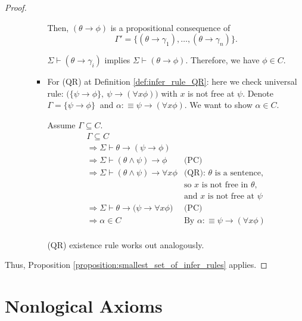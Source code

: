 \documentclass[11pt,letterpaper]{book}
\theoremstyle{definition}
\begin{document}
\begin{proof}
\begin{enumerate}
\begin{enumerate}
\begin{itemize}
{Then, $(\theta \rightarrow \phi)$ is a propositional consequence of
$$\Gamma' = \{ (\theta \rightarrow \gamma_1), \ldots, (\theta
\rightarrow \gamma_n)  \} .$$

$\Sigma \vdash (\theta \rightarrow \gamma_i)$ implies $\Sigma \vdash
(\theta \rightarrow \phi) $. Therefore, we have $\phi \in C$.
}
\item{For (QR) at Definition \ref{def:infer_rule_QR}: here we check
universal rule: $\Big( \{ \psi \rightarrow \phi \},\ \psi \rightarrow
(\forall x \phi ) \Big) $ with $x$ is not free at $\psi$. Denote $
\Gamma = \{ \psi \rightarrow \phi \} \ $ and $\alpha :\equiv \psi
\rightarrow (\forall x \phi )$. We want to show $\alpha \in C$.

Assume $\Gamma \subseteq C$.
\begin{equation}
\begin{array}{ll}
\Gamma \subseteq C & \\
\Rightarrow \Sigma \vdash \theta \rightarrow (\psi \rightarrow \phi) & \\
\Rightarrow \Sigma \vdash (\theta \land \psi) \rightarrow \phi &
\text{(PC)} \\
\Rightarrow \Sigma \vdash (\theta \land \psi) \rightarrow \forall x \phi
& \text{(QR): $\theta$ is a sentence,} \\
& \text{so $x$ is not free in $\theta$,} \\
& \text{and $x$ is not free at $\psi$} \\
\Rightarrow \Sigma \vdash \theta \rightarrow \big( \psi \rightarrow
\forall x \phi \big) & \text{(PC)} \\
\Rightarrow \alpha \in C &  \text{By } \alpha :\equiv \psi \rightarrow
(\forall x \phi ) \\
\end{array}\nonumber
\end{equation}

(QR) existence rule works out analogously.
}
\end{itemize}
\end{enumerate}

\end{enumerate}

Thus, Proposition \ref{proposition:smallest_set_of_infer_rules} applies.

\end{proof}

\section{Nonlogical Axioms}
\end{document}
